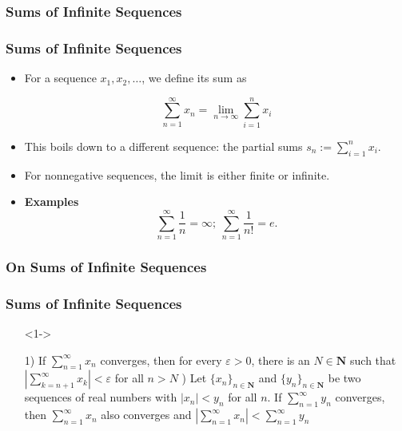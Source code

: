 \documentclass[handout]{beamer}
\begin{document}
\subsubsection{Sums of Infinite Sequences}

\frame
{
  \frametitle{Sums of Infinite Sequences}

   \begin{itemize}
  \item <1-> For a sequence $x_1,x_2,\ldots$, we define its sum as 
  
  $$\sum_{n=1}^{\infty} x_n=\lim_{n\rightarrow\infty} \sum_{i=1}^n x_i $$
  
  \item<2-> This boils down to a different sequence: the partial sums $s_n := \sum_{i=1}^n x_i$. 
  
   \item<3-> For nonnegative sequences, the limit is either finite or infinite.    
   \item<4-> \textbf{Examples} $$\sum_{n=1}^{\infty} \frac{1}{n}= \infty;\ \sum_{n=1}^{\infty} \frac{1}{n!}= e.$$
       
  \end{itemize}
}


\subsubsection{On Sums of Infinite Sequences}

\frame
{
  \frametitle{Sums of Infinite Sequences}

   \begin{itemize}

 
  
   \item[]<1-> \begin{Theorem} 1) If $\sum_{n=1}^{\infty} x_n$ converges, then for every $\varepsilon>0$, there is an $N\in \mathbf{N}$ such that $|\sum_{k=n+1}^{\infty} x_k|<\varepsilon$ for all $n>N$ ) Let $\{x_{n}\}_{n\in \mathbf{N}}$ and $\{y_{n}\}_{n\in \mathbf{N}}$ be two sequences of real numbers with $|x_n|<y_n$ for all $n$. If $\sum_{n=1}^{\infty} y_n$ converges, then $\sum_{n=1}^{\infty} x_n$ also converges and $|\sum_{n=1}^{\infty} x_n|<\sum_{n=1}^{\infty} y_n$ \end{Theorem} 
      
       
  \end{itemize}
}
\end{document}
